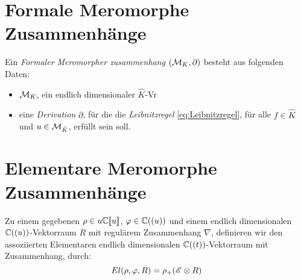 \section{Formale Meromorphe Zusammenhänge}

\begin{defn}
  Ein \emph{Formaler Meromorpher zusammenhang} $(\mathcal{M}_K,\partial)$ besteht aus 
  folgenden Daten:
  \begin{itemize}
    \item $\mathcal{M}_K$, ein endlich dimensionaler $\hat K$-Vr
    \item eine \emph{Derivation} $\partial$, für die die \emph{Leibnitzregel} 
      \eqref{eq:Leibnitzregel}, für alle $f\in \hat K$ und $u\in \mathcal{M}_{\hat K}$,
      erfüllt sein soll.
  \end{itemize}
\end{defn}

\begin{comment}
  Oder einfach ein Meromorpher Zshg. über anderes $K$ also $\hat K$
\end{comment}

\section{Elementare Meromorphe Zusammenhänge}

\begin{defn}
  Zu einem gegebenen $\rho\in u\mathbb{C}\llbracket u\rrbracket$, $\varphi\in\mathbb{C}((u))$ und
  einem endlich dimensionalen $\mathbb{C}((u))$-Vektorraum $R$ mit regulärem 
  Zusammenhang $\nabla$, definieren wir den assoziierten Elementaren endlich
  dimensionalen $\mathbb{C}((t))$-Vektorraum mit Zusammenhang, durch:
  \[
    El(\rho,\varphi,R)=\rho_+(\mathscr{E}\otimes R)
  \]
\end{defn}


